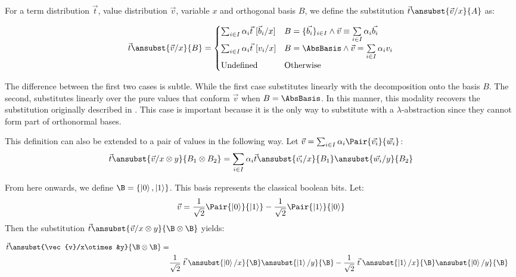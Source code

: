 \begin{definition}
  For a term distribution $\vec{t}$, value distribution $\vec{v}$, variable $x$ and orthogonal basis $B$, we define the substitution $\vec{t}\ansubst{\vec{v}/x}{A}$ as:
  
  \[
  \vec{t}\ansubst{\vec{v}/x}{B} = 
    \begin{cases}
      \sum_{i\in I} \alpha_i \vec t\ [\vec b_i / x] 
      & B=\{\vec{b_i}\}_{i\in I}\wedge\vec{v}\equiv\sum\limits_{i\in I} \alpha_i \vec{b_i} \\
      \sum_{i\in I}\alpha_i\vec{t}\ [v_i/x] & B = \AbsBasis\wedge\vec{v}=\sum\limits_{i\in I}\alpha_i v_i\\
      \text{Undefined} & \text{Otherwise}
    \end{cases}
  \]
  
  The difference between the first two cases is subtle. While the first case substitutes linearly with the decomposition onto the basis $B$. The second, substitutes linearly over the pure values that conform $\vec{v}$ when $B=\AbsBasis$. In this manner, this modality recovers the substitution originally described in \cite{DiazcaroGuillermoMiquelValironLICS19}. This case is important because it is the only way to substitute with a $\lambda$-abstraction since they cannot form part of orthonormal bases. 

  This definition can also be extended to a pair of values in the following way. Let $\vec v = \sum_{i\in I} \alpha_i \Pair{\vec{v_i}}{\vec{w_i}}$:
  \[
    \vec t\ansubst{\vec{v}/x\otimes y}{B_1 \otimes B_2} = \sum_{i\in I} \alpha_i \vec t\ansubst{\vec{v_i}/x}{B_1}\ansubst{\vec{w_i}/y}{B_2}
  \]
\end{definition}

\begin{example}
From here onwards, we define $\B = \{\ket{0}, \ket{1}\}$. This basis represents the classical boolean bits. Let: 
\[\vec{v}= \frac{1}{\sqrt{2}} \Pair{\ket{0}}{\ket{1}} - \frac{1}{\sqrt{2}}\Pair{\ket{1}}{\ket{0}}\]
Then the substitution $\vec{t}\ansubst{\vec{v}/x\otimes y}{\B\otimes\B}$ yields:

\begin{align*}
\vec{t}\ansubst{\vec{v}/x\otimes &y}{\B\otimes\B} = \\ 
&\frac{1}{\sqrt{2}}\;\vec{t}\;\ansubst{\ket{0}/x}{\B}\ansubst{\ket{1}/y}{\B} - \frac{1}{\sqrt{2}}\;\vec{t}\;\ansubst{\ket{1}/x}{\B}\ansubst{\ket{0}/y}{\B}
\end{align*}

\end{example}


